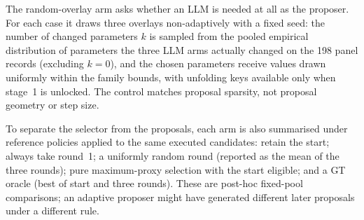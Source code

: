\documentclass[a4paper,fleqn]{cas-dc}
\begin{document}
The random-overlay arm asks whether an LLM is needed at all as the proposer. For each case it draws three overlays non-adaptively with a fixed seed: the number of changed parameters $k$ is sampled from the pooled empirical distribution of parameters the three LLM arms actually changed on the 198 panel records (excluding $k=0$), and the chosen parameters receive values drawn uniformly within the family bounds, with unfolding keys available only when stage~1 is unlocked. The control matches proposal sparsity, not proposal geometry or step size.

To separate the selector from the proposals, each arm is also summarised under reference policies applied to the same executed candidates: retain the start; always take round~1; a uniformly random round (reported as the mean of the three rounds); pure maximum-proxy selection with the start eligible; and a GT oracle (best of start and three rounds). These are post-hoc fixed-pool comparisons; an adaptive proposer might have generated different later proposals under a different rule.
\end{document}
